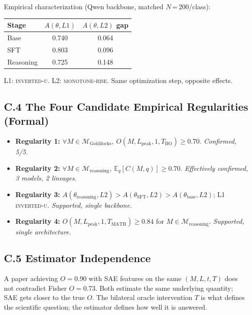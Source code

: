 \documentclass[11pt]{article}
\begin{document}
Empirical characterization (Qwen backbone, matched $N$\,=\,200/class):

\begin{center}
\begin{tabular}{lcc}
\toprule
Stage & $A(\theta, L1)$ & $A(\theta, L2)$ gap \\
\midrule
Base & 0.740 & 0.064 \\
SFT & 0.803 & 0.096 \\
Reasoning & 0.725 & 0.148 \\
\bottomrule
\end{tabular}
\end{center}

L1: \textsc{inverted-u}. L2: \textsc{monotone-rise}. Same optimization step, opposite effects.

\subsection*{C.4 The Four Candidate Empirical Regularities (Formal)}

\begin{itemize}
  \item \textbf{Regularity 1:} $\forall M \in \mathcal{M}_{\text{Goldilocks}},\ O(M, L_{\text{peak}}, 1, T_{\text{BO}}) \geq 0.70$. \emph{Confirmed, 5/5.}
  \item \textbf{Regularity 2:} $\forall M \in \mathcal{M}_{\text{reasoning}},\ \mathbb{E}_q[C(M,q)] \geq 0.70$. \emph{Effectively confirmed, 3 models, 2 lineages.}
  \item \textbf{Regularity 3:} $A(\theta_{\text{reasoning}}, L2) > A(\theta_{\text{SFT}}, L2) > A(\theta_{\text{base}}, L2)$; L1 \textsc{inverted-u}. \emph{Supported, single backbone.}
  \item \textbf{Regularity 4:} $O(M, L_{\text{peak}}, 1, T_{\text{MATH}}) \geq 0.84$ for $M \in \mathcal{M}_{\text{reasoning}}$. \emph{Supported, single architecture.}
\end{itemize}

\subsection*{C.5 Estimator Independence}

A paper achieving $O = 0.90$ with SAE features on the same $(M, L, t, T)$ does not
contradict Fisher $O = 0.73$. Both estimate the same underlying quantity; SAE gets
closer to the true $O$. The bilateral oracle intervention $T$ is what defines the
scientific question; the estimator defines how well it is answered.
\end{document}
